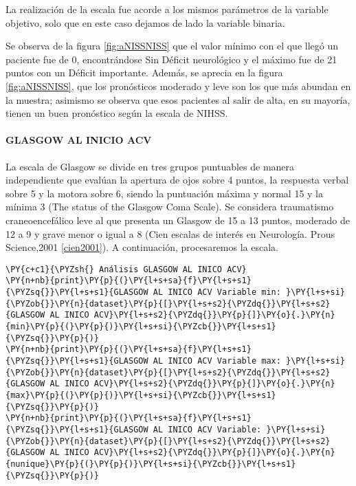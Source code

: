     La realización de la escala fue acorde a los mismos parámetros de la variable objetivo, solo que en este caso dejamos de lado la variable
binaria.

Se observa de la figura \ref{fig:aNISSNISS} que el valor mínimo con el que llegó un paciente fue de 0, encontrándose Sin Déficit neurológico y el máximo fue de 21 puntos con un Déficit importante. Además, se aprecia en la figura \ref{fig:aNISSNISS}, que los pronósticos moderado y leve son los que más abundan en la muestra; asimismo se observa que esos pacientes al salir de alta, en su mayoría, tienen un buen pronóstico según la escala de NIHSS.

    \hypertarget{glasgow-al-inico-acv}{%
\paragraph{GLASGOW AL INICIO ACV}\label{glasgow-al-inico-acv}}

La escala de Glasgow se divide en tres grupos puntuables de manera independiente que evalúan la apertura de ojos sobre 4 puntos, la respuesta verbal sobre 5 y la motora sobre 6, siendo la puntuación máxima y normal 15 y la mínima 3 (The status of the Glasgow Coma Scale). Se considera traumatismo craneoencefálico leve al que presenta un Glasgow de 15 a 13 puntos, moderado de 12 a 9 y grave menor o igual a 8 (Cien escalas de interés en Neurología. Prous Science,2001 \ref{cien2001}). A continuación, procesaremos la escala.

    \begin{tcolorbox}[breakable, size=fbox, boxrule=1pt, pad at break*=1mm,colback=cellbackground, colframe=cellborder]
\begin{Verbatim}[commandchars=\\\{\}]
\PY{c+c1}{\PYZsh{} Análisis GLASGOW AL INICO ACV}
\PY{n+nb}{print}\PY{p}{(}\PY{l+s+sa}{f}\PY{l+s+s1}{\PYZsq{}}\PY{l+s+s1}{GLASGOW AL INICO ACV Variable min: }\PY{l+s+si}{\PYZob{}}\PY{n}{dataset}\PY{p}{[}\PY{l+s+s2}{\PYZdq{}}\PY{l+s+s2}{GLASGOW AL INICO ACV}\PY{l+s+s2}{\PYZdq{}}\PY{p}{]}\PY{o}{.}\PY{n}{min}\PY{p}{(}\PY{p}{)}\PY{l+s+si}{\PYZcb{}}\PY{l+s+s1}{\PYZsq{}}\PY{p}{)}
\PY{n+nb}{print}\PY{p}{(}\PY{l+s+sa}{f}\PY{l+s+s1}{\PYZsq{}}\PY{l+s+s1}{GLASGOW AL INICO ACV Variable max: }\PY{l+s+si}{\PYZob{}}\PY{n}{dataset}\PY{p}{[}\PY{l+s+s2}{\PYZdq{}}\PY{l+s+s2}{GLASGOW AL INICO ACV}\PY{l+s+s2}{\PYZdq{}}\PY{p}{]}\PY{o}{.}\PY{n}{max}\PY{p}{(}\PY{p}{)}\PY{l+s+si}{\PYZcb{}}\PY{l+s+s1}{\PYZsq{}}\PY{p}{)}
\PY{n+nb}{print}\PY{p}{(}\PY{l+s+sa}{f}\PY{l+s+s1}{\PYZsq{}}\PY{l+s+s1}{GLASGOW AL INICO ACV Variable: }\PY{l+s+si}{\PYZob{}}\PY{n}{dataset}\PY{p}{[}\PY{l+s+s2}{\PYZdq{}}\PY{l+s+s2}{GLASGOW AL INICO ACV}\PY{l+s+s2}{\PYZdq{}}\PY{p}{]}\PY{o}{.}\PY{n}{nunique}\PY{p}{(}\PY{p}{)}\PY{l+s+si}{\PYZcb{}}\PY{l+s+s1}{\PYZsq{}}\PY{p}{)}
\end{Verbatim}
\end{tcolorbox}

